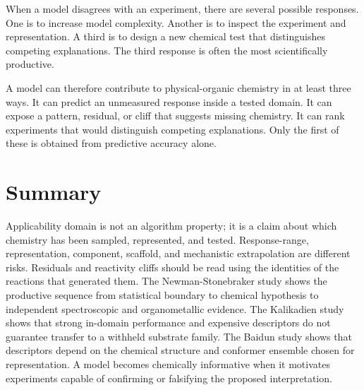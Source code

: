When a model disagrees with an experiment, there are several possible responses.
One is to increase model complexity.
Another is to inspect the experiment and representation.
A third is to design a new chemical test that distinguishes competing explanations.
The third response is often the most scientifically productive.


A model can therefore contribute to physical-organic chemistry in at least three ways.
It can predict an unmeasured response inside a tested domain.
It can expose a pattern, residual, or cliff that suggests missing chemistry.
It can rank experiments that would distinguish competing explanations.
Only the first of these is obtained from predictive accuracy alone.

\section{Summary}

Applicability domain is not an algorithm property; it is a claim about which chemistry has been sampled, represented, and tested.
Response-range, representation, component, scaffold, and mechanistic extrapolation are different risks.
Residuals and reactivity cliffs should be read using the identities of the reactions that generated them.
The Newman-Stonebraker study shows the productive sequence from statistical boundary to chemical hypothesis to independent spectroscopic and organometallic evidence.
The Kalikadien study shows that strong in-domain performance and expensive descriptors do not guarantee transfer to a withheld substrate family.
The Baidun study shows that descriptors depend on the chemical structure and conformer ensemble chosen for representation.
A model becomes chemically informative when it motivates experiments capable of confirming or falsifying the proposed interpretation.
